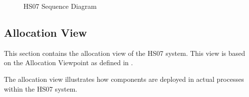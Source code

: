 \documentclass[a4paper,10pt]{article}
\begin{document}
\begin{figure}[!htb]
\caption{HS07 Sequence Diagram}
\label{fig:sequence}
\end{figure}


\subsection{Allocation View}

This section contains the allocation view of the HS07 system. This view
is based on the Allocation Viewpoint as defined in \cite{christensen2004archdesc}.

The allocation view illustrates how components are deployed in actual
processes within the HS07 system. 
\end{document}
